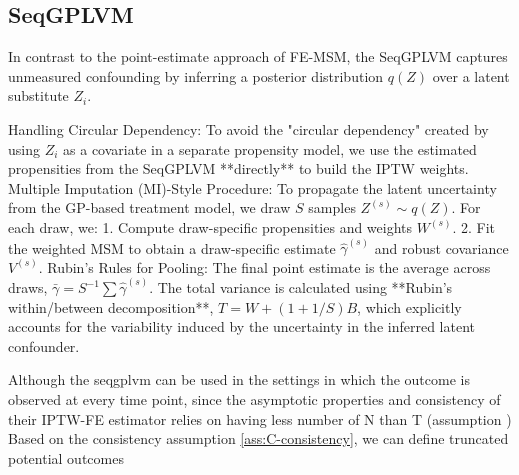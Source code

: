 \subsection{SeqGPLVM}

In contrast to the point-estimate approach of FE-MSM, the SeqGPLVM captures unmeasured confounding by inferring a posterior distribution $q(Z)$ over a latent substitute $Z_i$.

Handling Circular Dependency: To avoid the "circular dependency" created by using $Z_i$ as a covariate in a separate propensity model, we use the estimated propensities from the SeqGPLVM **directly** to build the IPTW weights.
Multiple Imputation (MI)-Style Procedure: To propagate the latent uncertainty from the GP-based treatment model, we draw $S$ samples $Z^{(s)} \sim q(Z)$. For each draw, we:
    1.  Compute draw-specific propensities and weights $W^{(s)}$.
    2.  Fit the weighted MSM to obtain a draw-specific estimate $\hat{\gamma}^{(s)}$ and robust covariance $V^{(s)}$.
Rubin’s Rules for Pooling: The final point estimate is the average across draws, $\bar{\gamma} = S^{-1}\sum \hat{\gamma}^{(s)}$. The total variance is calculated using **Rubin’s within/between decomposition**, $T = W + (1 + 1/S)B$, which explicitly accounts for the variability induced by the uncertainty in the inferred latent confounder.



Although the seqgplvm can be used in the settings in which the outcome is observed at every time point, 
since the asymptotic properties and consistency of their IPTW-FE estimator 
relies on having less number of N than T (assumption )
Based on the consistency assumption \ref{ass:C-consistency}, we can define 
truncated potential outcomes 